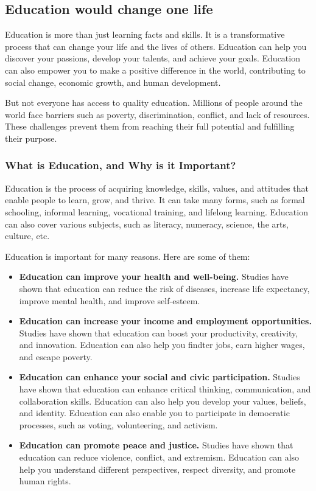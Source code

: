 \documentclass[a4paper,11pt]{article}
\begin{document}
\subsection{Education would change one life}
Education is more than just learning facts and skills. It is a transformative process that can change your life and the lives of others. Education can help you discover your passions, develop your talents, and achieve your goals. Education can also empower you to make a positive difference in the world, contributing to social change, economic growth, and human development.

But not everyone has access to quality education. Millions of people around the world face barriers such as poverty, discrimination, conflict, and lack of resources. These challenges prevent them from reaching their full potential and fulfilling their purpose.\cite{education-change-life-world}

\subsubsection{What is Education, and Why is it Important?}

Education is the process of acquiring knowledge, skills, values, and attitudes that enable people to learn, grow, and thrive. It can take many forms, such as formal schooling, informal learning, vocational training, and lifelong learning. Education can also cover various subjects, such as literacy, numeracy, science, the arts, culture, etc.

Education is important for many reasons. Here are some of them:

\begin{itemize}
	\item \textbf{Education can improve your health and well-being.} Studies have shown that education can reduce the risk of diseases, increase life expectancy, improve mental health, and improve self-esteem.
	\item \textbf{Education can increase your income and employment opportunities.} 
	 Studies have shown that education can boost your productivity, creativity, and innovation. Education can also help you findter jobs, earn higher wages, and escape poverty.
	\item \textbf{Education can enhance your social and civic participation.} Studies have shown that education can enhance critical thinking, communication, and collaboration skills. Education can also help you develop your values, beliefs, and identity. Education can also enable you to participate in democratic processes, such as voting, volunteering, and activism.
	\item \textbf{Education can promote peace and justice.}
	 Studies have shown that education can reduce violence, conflict, and extremism. Education can also help you understand different perspectives, respect diversity, and promote human rights.
\end{itemize}
\end{document}
